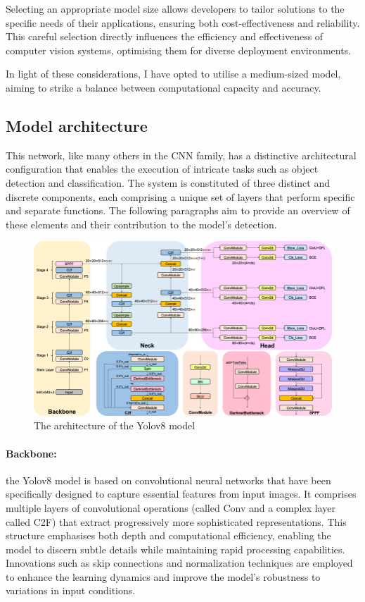 Selecting an appropriate model size allows developers to tailor solutions to the specific needs of their applications, ensuring both cost-effectiveness and reliability.
This careful selection directly influences the efficiency and effectiveness of computer vision systems, optimising them for diverse deployment environments.

In light of these considerations, I have opted to utilise a medium-sized model, aiming to strike a balance between computational capacity and accuracy.

\subsection{Model architecture}\label{subsec:architecture}
This network, like many others in the CNN family, has a distinctive architectural configuration that
enables the execution of intricate tasks such as object detection and classification.
The system is constituted of three distinct and discrete components,
each comprising a unique set of layers that perform specific and separate functions.
The following paragraphs aim to provide an overview of these elements and their contribution to the model's detection.

\begin{figure}[ht]
\includegraphics[width=1.0\textwidth]{figures/Detailed-illustration-of-YOLOv8-model-architecture-The-Backbone-Neck-and-Head-are-the}
\caption{The architecture of the Yolov8 model~\cite{FractureDetection2024}}
\label{fig:architecture}
\end{figure}
\newpage
\paragraph{Backbone:}\label{par:backbone}
the Yolov8 model is based on convolutional neural networks that have been specifically designed to capture essential features from input images.
It comprises multiple layers of convolutional operations (called Conv and a complex layer called C2F)
that extract progressively more sophisticated representations.
This structure emphasises both depth and computational efficiency,
enabling the model to discern subtle details while maintaining rapid processing capabilities.
Innovations such as skip connections and normalization techniques are employed to enhance the learning dynamics and improve the model's robustness to variations in input conditions.

